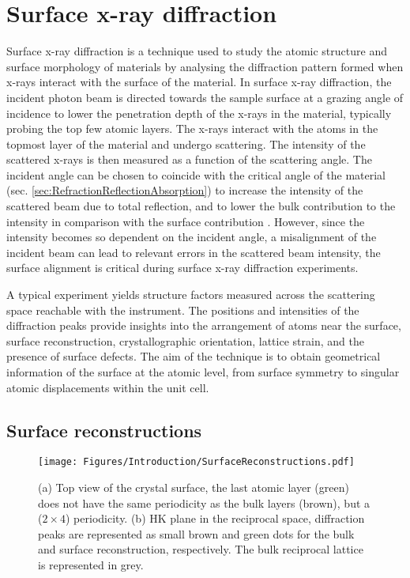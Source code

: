 \section{Surface x-ray diffraction} \label{sec:SXRD}

Surface x-ray diffraction is a technique used to study the atomic structure and surface morphology of materials by analysing the diffraction pattern formed when x-rays interact with the surface of the material.
In surface x-ray diffraction, the incident photon beam is directed towards the sample surface at a grazing angle of incidence to lower the penetration depth of the x-rays in the material, typically probing the top few atomic layers.
The x-rays interact with the atoms in the topmost layer of the material and undergo scattering.
The intensity of the scattered x-rays is then measured as a function of the scattering angle.
The incident angle can be chosen to coincide with the critical angle of the material (sec. \ref{sec:RefractionReflectionAbsorption}) to increase the intensity of the scattered beam due to total reflection, and to lower the bulk contribution to the intensity in comparison with the surface contribution \parencite{Feidenhansl1989, Moritz2022}.
However, since the intensity becomes so dependent on the incident angle, a misalignment of the incident beam can lead to relevant errors in the scattered beam intensity, the surface alignment is critical during surface x-ray diffraction experiments.

A typical experiment yields structure factors measured across the scattering space reachable with the instrument.
The positions and intensities of the diffraction peaks provide insights into the arrangement of atoms near the surface, surface reconstruction, crystallographic orientation, lattice strain, and the presence of surface defects.
The aim of the technique is to obtain geometrical information of the surface at the atomic level, from surface symmetry to singular atomic displacements within the unit cell.

\subsection{Surface reconstructions} \label{sec:SurfaceReconstructions}

\begin{figure}[!htb]
    \centering
    \texttt{[image: Figures/Introduction/SurfaceReconstructions.pdf]}
    \caption{
    (a) Top view of the crystal surface, the last atomic layer (green) does not have the same periodicity as the bulk layers (brown), but a ($2\times4$) periodicity.
    (b) HK plane in the reciprocal space, diffraction peaks are represented as small brown and green dots for the bulk and surface reconstruction, respectively. The bulk reciprocal lattice is represented in grey.
    }
    \label{fig:SurfaceReconstructions}
\end{figure}

